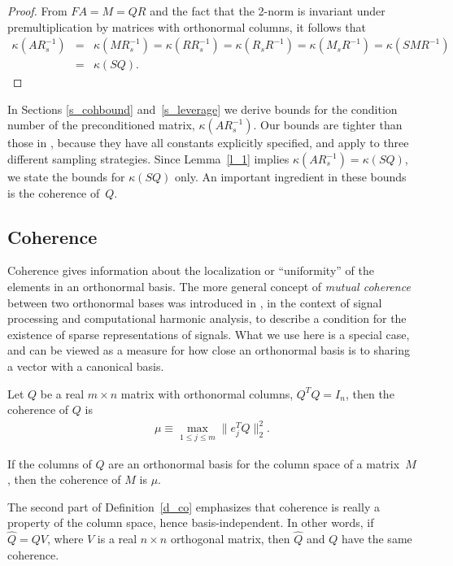 \documentclass{siamltex}
\begin{document}
\begin{proof}
From $FA=M=QR$  and the fact that the 2-norm is invariant
under premultiplication by matrices with orthonormal columns, it follows that
\begin{eqnarray*}
\kappa(AR_s^{-1})&=&\kappa(MR_s^{-1})=\kappa(RR_s^{-1})
=\kappa(R_sR^{-1})=\kappa(M_sR^{-1})=\kappa(SMR^{-1})\\
&=&\kappa(SQ).
\end{eqnarray*}
\end{proof}

In Sections \ref{s_cohbound} and~\ref{s_leverage}
we derive bounds for the condition number
of the preconditioned matrix, $\kappa(AR_s^{-1})$.
Our bounds are tighter than those in \cite[Theorem 3.2]{AMTol10},
because they have all constants explicitly specified,
and apply to three different sampling strategies.
Since Lemma~\ref{l_1} implies $\kappa(AR_s^{-1})=\kappa(SQ)$,
we state the bounds for $\kappa(SQ)$ only.
An important ingredient in these bounds is the coherence of~$Q$.

\subsection{Coherence}\label{s_coh}
Coherence gives information about the localization or ``uniformity''
of the elements in an orthonormal basis.  The more general concept of
\textit{mutual coherence} between two orthonormal bases was introduced
in \cite[\S VII]{DoH01}, in the context of signal processing and
computational harmonic analysis, to describe a condition for the
existence of sparse representations of signals.  What we use here is a
special case, and can be viewed as a measure for how close an
orthonormal basis is to sharing a vector with a canonical basis.

\begin{definition}\label{d_co}
Let $Q$ be  a real $m\times n$ matrix with orthonormal columns, $Q^TQ=I_n$,
then the {\rm coherence} of $Q$ is 
\begin{eqnarray*}\label{e_coherence}
\mu\equiv \max_{1\leq j\leq m}\|e_j^TQ\|_2^2.
\end{eqnarray*}

If the columns of $Q$ are an orthonormal basis for the column space of
a matrix~$M$, then the coherence of $M$ is $\mu$.
\end{definition}

The second part of Definition~\ref{d_co} emphasizes that coherence is really
a property of the column space, hence basis-independent.  In other
words, if $\hat{Q}=QV$, where $V$ is a real $n\times n$ orthogonal
matrix, then $\hat{Q}$ and $Q$ have the same coherence.
\end{document}

